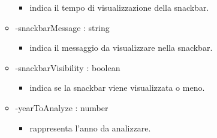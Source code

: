 \begin{itemize}
\begin{itemize}
\begin{itemize}
			\item indica il tempo di visualizzazione della snackbar.\end{itemize}
		\item -snackbarMessage : string\begin{itemize}
			\item indica il messaggio da visualizzare nella snackbar.\end{itemize}
		\item -snackbarVisibility : boolean\begin{itemize}
			\item indica se la snackbar viene visualizzata o meno.\end{itemize}
		\item -yearToAnalyze : number\begin{itemize}
			\item rappresenta l'anno da analizzare.\end{itemize}
	\end{itemize}
\end{itemize}

